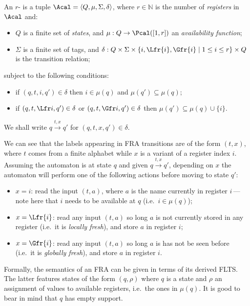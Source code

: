 \begin{definition}\label{def:FRAs}
  An $r$- is a tuple $\Acal=\langle Q,\mu,\Sigma,\delta\rangle$, where $r\in\mathbb{N}$ is the number of \emph{registers} in $\Acal$ and:
  \begin{itemize}
  \item $Q$ is a finite set of \emph{states}, and $\mu:Q\to\Pcal([1,r])$ an \emph{availability function};
  \item $\Sigma$ is a finite set of {tags}, and
 $\delta:Q\times\Sigma\times\{i,\Lfr{i},\Gfr{i}\mid 1\leq i\leq r\}\times Q$ is the transition relation;
    \end{itemize}
    subject to the following conditions:
    \begin{itemize}
    \item if $(q,t,i,q')\in\delta$ then $i\in\mu(q)$ and $\mu(q')\subseteq\mu(q)$;
    \item
      if $(q,t,\Lfr i,q')\in\delta$ or $(q,t,\Gfr i,q')\in\delta$ then $\mu(q')\subseteq\mu(q)\cup\{i\}$.
    \end{itemize}
    We shall write $q\xrightarrow{t,x}q'$ for $(q,t,x,q')\in\delta$.
  \end{definition}

  We can see that the labels appearing in FRA transitions are of the form $(t,x)$, where $t$ comes from a finite alphabet while $x$ is a variant of a register index $i$.
Assuming the automaton is at state $q$ and given $q\xrightarrow{t,x}q'$, 
depending on $x$ the automaton will perform one of the following actions before moving to state $q'$:
  \begin{itemize}
  \item $x=i$: read the input $(t,a)$, where $a$ is the name currently in register $i$\,---\,note here that $i$ needs to be available at $q$ (i.e.\ $i\in\mu(q)$);
  \item $x=\Lfr{i}$: read any input $(t,a)$ so long $a$ is not currently stored in any register (i.e.\ it is \emph{locally fresh}), and store $a$ in register $i$;
  \item $x=\Gfr{i}$: read any input $(t,a)$ so long $a$ is has not be seen before (i.e.\ it is \emph{globally fresh}), and store $a$ in register $i$.
  \end{itemize}
Formally, the semantics of an FRA can be given in terms of its derived FLTS.
The latter features states of the form $(q,\rho)$ where $q$ is a state and $\rho$ an assignment of values to available registers, i.e.\ the ones in $\mu(q)$.
It is good to bear in mind that $q$ has empty support.

